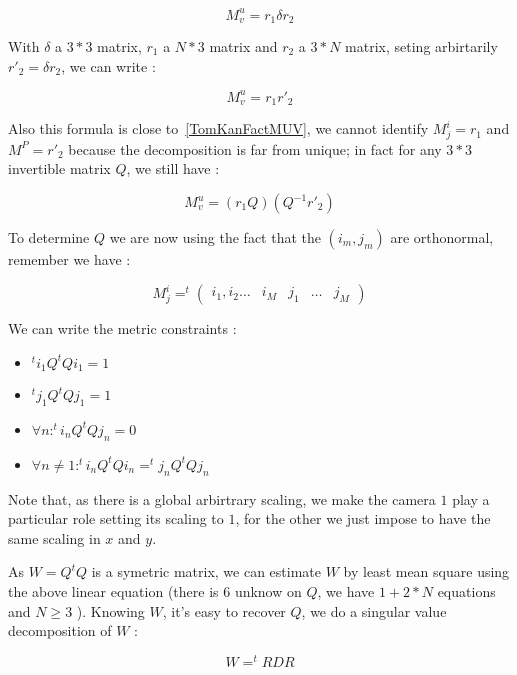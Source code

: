 \begin{equation}
   M^u_v=   r_1  \delta r_2
\end{equation}

With $\delta$ a $3*3$ matrix, $r_1$ a $N*3$ matrix and $r_2$ a $3*N$ matrix, seting arbirtarily 
$r'_2 =  \delta r_2$, we can write  :

\begin{equation}
   M^u_v=   r_1   r'_2
\end{equation}


Also this formula is close to~\ref{TomKanFactMUV}, we cannot identify $M^i_j=r_1$ and $ M^P=r'_2$
because the decomposition is far from unique; in fact for any $3*3$ invertible 
matrix $Q$, we still have :

\begin{equation}
   M^u_v=   (r_1 Q) ( Q^{-1}  r'_2)
\end{equation}

To determine $Q$ we are now using the fact that  the $(i_m,j_m)$ are orthonormal, remember we have : 


\begin{equation}
   M^i_j=   ^t \left( \begin{array}{ccccccc} i_1, i_2 \dots & i_M & j_1 & \dots & j_M 
        \end{array} 
\right)
\end{equation}


We can write the metric constraints :

\begin{itemize}
   \item  $  ^t i_1 Q ^t Q i_1 = 1 $
   \item  $  ^t j_1 Q ^t Q j_1 = 1 $
   \item  $\forall n :  ^t i_n Q ^t Q j_n = 0 $
   \item  $\forall n \neq 1 :  ^t i_n Q ^t Q i_n =  ^t j_n Q ^t Q j_n   $
\end{itemize}

Note that, as there is a global arbirtrary scaling, we make the camera $1$ play a particular
role setting its scaling to $1$, for the other we just impose to have the same scaling
in $x$ and $y$.

As $W=Q ^t Q$ is a symetric matrix, we can estimate $W$  by least mean square using the
above linear equation (there is $6$ unknow on $Q$, we have  $1+2*N$ equations and   $N\geq 3$ ). 
Knowing $W$, it's easy to recover $Q$, we do a singular
value decomposition of $W$ :

\begin{equation}
    W =  ^t R D R
\end{equation}

